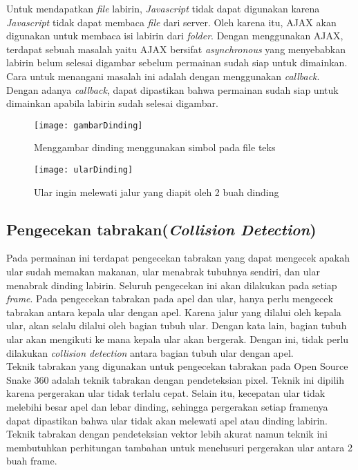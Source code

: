 Untuk mendapatkan \textit{file} labirin, \textit{Javascript} tidak dapat digunakan karena \textit{Javascript} tidak dapat membaca \textit{file} dari server. Oleh karena itu, AJAX akan digunakan untuk membaca isi labirin dari \textit{folder}. Dengan menggunakan AJAX, terdapat sebuah masalah yaitu AJAX bersifat \textit{asynchronous} yang menyebabkan labirin belum selesai digambar sebelum permainan sudah siap untuk dimainkan. Cara untuk menangani masalah ini adalah dengan menggunakan \textit{callback}. Dengan adanya \textit{callback}, dapat dipastikan bahwa permainan sudah siap untuk dimainkan apabila labirin sudah selesai digambar.\\ 

\begin{figure}[H]
	\centering  
	\texttt{[image: gambarDinding]}  
	\caption[Menggambar dinding menggunakan simbol pada file teks]{Menggambar dinding menggunakan simbol pada file teks}
	\label{fig:gambarDinding} 
\end{figure}

\begin{figure}[H]
	\centering  
	\texttt{[image: ularDinding]}  
	\caption[Ular ingin melewati jalur yang diapit oleh 2 buah dinding]{Ular ingin melewati jalur yang diapit oleh 2 buah dinding}
	\label{fig:ularDinding} 
\end{figure}

\subsection{Pengecekan tabrakan(\textit{Collision Detection})}
Pada permainan ini terdapat pengecekan tabrakan yang dapat mengecek apakah ular sudah memakan makanan, ular menabrak tubuhnya sendiri, dan ular menabrak dinding labirin. Seluruh pengecekan ini akan dilakukan pada setiap \textit{frame}. Pada pengecekan tabrakan pada apel dan ular, hanya perlu mengecek tabrakan antara kepala ular dengan apel. Karena jalur yang dilalui oleh kepala ular, akan selalu dilalui oleh bagian tubuh ular. Dengan kata lain, bagian tubuh ular akan mengikuti ke mana kepala ular akan bergerak. Dengan ini, tidak perlu dilakukan \textit{collision detection} antara bagian tubuh ular dengan apel.\\

Teknik tabrakan yang digunakan untuk pengecekan tabrakan pada Open Source Snake 360 adalah teknik tabrakan dengan pendeteksian pixel. Teknik ini dipilih karena pergerakan ular tidak terlalu cepat. Selain itu, kecepatan ular tidak melebihi besar apel dan lebar dinding, sehingga pergerakan setiap framenya dapat dipastikan bahwa ular tidak akan melewati apel atau dinding labirin. Teknik tabrakan dengan pendeteksian vektor lebih akurat namun teknik ini membutuhkan perhitungan tambahan untuk menelusuri pergerakan ular antara 2 buah frame.\\

